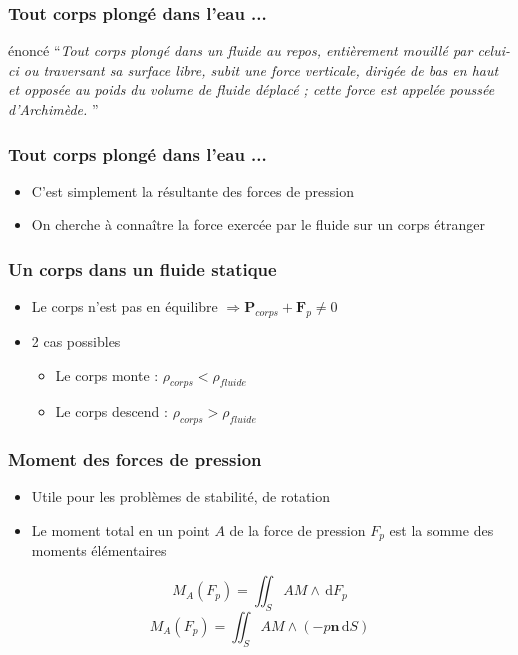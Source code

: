 \documentclass[%
	final, %
	 10pt, %
 	compress, %
hyperref={bookmarks=true}	
]{beamer}
\renewcommand{\v}[1]{\ensuremath{\bm{#1}}} %
\newcommand{\ddr}[1]{\, \mathrm{d} #1}
\begin{document}
\begin{frame}\frametitle{Tout corps plongé dans l'eau ...}
\begin{alertblock}{énoncé}
\enquote{\textit{Tout corps plongé dans un fluide au repos,
    entièrement mouillé par celui-ci ou traversant sa surface libre,
    subit une force verticale, dirigée de bas en haut et opposée au
    poids du volume de fluide déplacé ; cette force est appelée
    poussée d'Archimède. }}
\end{alertblock}
\end{frame}

\begin{frame}\frametitle{Tout corps plongé dans l'eau ...}
\begin{itemize}
\item C'est simplement la résultante des forces de pression
\item On cherche à connaître la force exercée par le fluide sur un
  corps étranger
\end{itemize}
\end{frame}

\begin{frame}\frametitle{Un corps dans un fluide statique}
\begin{itemize}
\item Le corps n'est pas en équilibre $\Rightarrow \v{P}_{corps} +
  \v{F}_{p} \neq 0$
\item 2 cas possibles
\begin{itemize}
\item Le corps monte : $\rho_{corps} < \rho_{fluide}$
\item Le corps descend : $\rho_{corps} > \rho_{fluide}$
\end{itemize}
\end{itemize}
\end{frame}

\begin{frame}\frametitle{Moment des forces de pression}
\begin{itemize}
\item Utile pour les problèmes de stabilité, de rotation
\item Le moment total en un point $A$ de la force de pression
  $F_{p}$ est la somme des moments élémentaires
\end{itemize}
\begin{dmath*}
M_{A} (F_{p}) = \iint_{S} AM \wedge \ddr F_{p}
\end{dmath*}
\begin{dmath*}
M_{A} (F_{p}) = \iint_{S} AM \wedge \left( -p \v{n} \ddr S \right)
\end{dmath*}
\end{frame}
\end{document}
